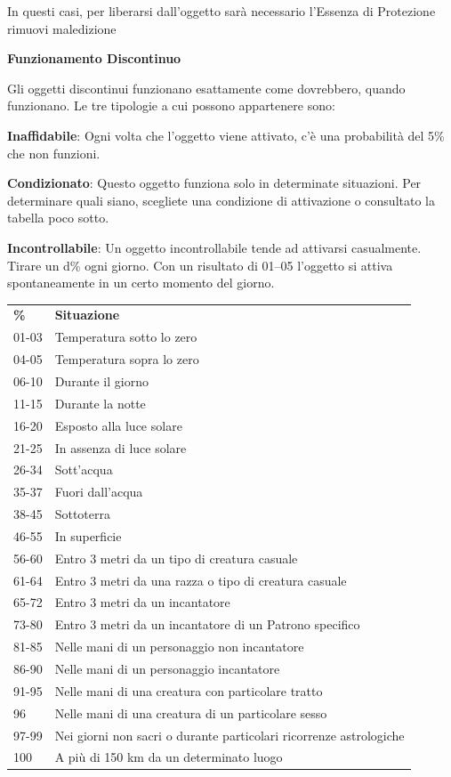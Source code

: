 \documentclass[a4paper,11pt,twoside,openany]{book}
\begin{document}
In questi casi, per liberarsi dall'oggetto sarà necessario l'Essenza di Protezione rimuovi maledizione

\textbf{Funzionamento Discontinuo}

Gli oggetti discontinui funzionano esattamente come dovrebbero, quando funzionano. Le tre tipologie a cui possono appartenere sono:

\textbf{Inaffidabile}: Ogni volta che l'oggetto viene attivato, c'è una probabilità del 5\% che non funzioni.

\textbf{Condizionato}: Questo oggetto funziona solo in determinate situazioni. Per determinare quali siano, scegliete una condizione di attivazione o consultato la tabella poco sotto.

\textbf{Incontrollabile}: Un oggetto incontrollabile tende ad attivarsi casualmente. Tirare un d\% ogni giorno. Con un risultato di 01--05 l'oggetto si attiva spontaneamente in un certo momento del giorno.

\bigskip

\begin{tabularx}{\textwidth}{lX}
	\toprule
	\textbf{\%} & \textbf{Situazione}\tabularnewline
	01-03       & Temperatura sotto lo zero\tabularnewline
	04-05       & Temperatura sopra lo zero\tabularnewline
	06-10       & Durante il giorno\tabularnewline
	11-15       & Durante la notte\tabularnewline
	16-20       & Esposto alla luce solare\tabularnewline
	21-25       & In assenza di luce solare\tabularnewline
	26-34       & Sott'acqua\tabularnewline
	35-37       & Fuori dall'acqua\tabularnewline
	38-45       & Sottoterra\tabularnewline
	46-55       & In superficie\tabularnewline
	56-60       & Entro 3 metri da un tipo di creatura casuale\tabularnewline
	61-64       & Entro 3 metri da una razza o tipo di creatura casuale\tabularnewline
	65-72       & Entro 3 metri da un incantatore\tabularnewline
	73-80       & Entro 3 metri da un incantatore di un Patrono specifico\tabularnewline
	81-85       & Nelle mani di un personaggio non incantatore\tabularnewline
	86-90       & Nelle mani di un personaggio incantatore\tabularnewline
	91-95       & Nelle mani di una creatura con particolare tratto\tabularnewline
	96          & Nelle mani di una creatura di un particolare sesso\tabularnewline
	97-99       & Nei giorni non sacri o durante particolari ricorrenze astrologiche\tabularnewline
	100         & A più di 150 km da un determinato luogo\tabularnewline
\end{tabularx}

\bigskip
\end{document}
